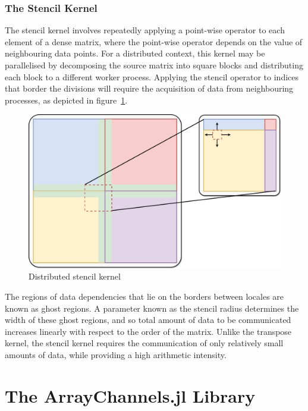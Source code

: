 \documentclass{juliacon}
\begin{document}
\subsubsection{The Stencil Kernel}

The stencil kernel involves repeatedly applying a point-wise operator to
each element of a dense matrix, where the point-wise operator depends on
the value of neighbouring data points. For a distributed context, this
kernel may be parallelised by decomposing the source matrix into square
blocks and distributing each block to a different worker process.
Applying the stencil operator to indices that border the divisions will
require the acquisition of data from neighbouring processes, as depicted
in figure~\ref{fig:stencil-diagram}.

\begin{figure}[htb]
	\includegraphics[width=\linewidth]{figs/Stencil.pdf}
	\caption{Distributed stencil kernel}
	\label{fig:stencil-diagram}
\end{figure}

The regions of data dependencies that lie on the borders between locales
are known as ghost regions. A parameter known as the stencil radius
determines the width of these ghost regions, and so total amount of data
to be communicated increases linearly with respect to the order of the
matrix. Unlike the transpose kernel, the stencil kernel requires the
communication of only relatively small amounts of data, while providing
a high arithmetic intensity.

\section{The ArrayChannels.jl Library}
\label{sec:arraychannels}
\end{document}
